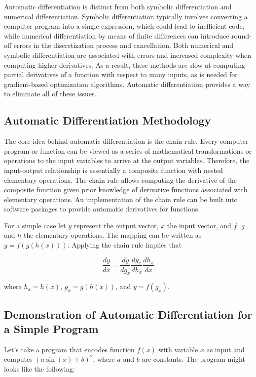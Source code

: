 \documentclass[book.tex]{subfiles}
\begin{document}
Automatic differentiation is distinct from both symbolic differentiation and numerical differentiation. Symbolic differentiation typically involves converting a computer program into a single expression, which could lead to inefficient code, while numerical differentiation by means of finite differences can introduce round-off errors in the discretization process and cancellation. Both numerical and symbolic differentiation are associated with errors and increased complexity when computing higher derivatives. As a result, these methods are slow at computing partial derivatives of a function with respect to many inputs, as is needed for gradient-based optimization algorithms. Automatic differentiation provides a way to eliminate all of these issues.

\subsection{Automatic Differentiation Methodology}
The core idea behind automatic differentiation is the chain rule. Every computer program or function can be viewed as a series of mathematical transformations or operations to the input variables to arrive at the output variables. Therefore, the input-output relationship is essentially a composite function with nested elementary operations. The chain rule allows computing the derivative of the composite function given prior knowledge of derivative functions associated with elementary operations. An implementation of the chain rule can be built into software packages to provide automatic derivatives for functions. 

For a simple case let $y$ represent the output vector, $x$  the input vector, and $f$, $g$ and $h$  the elementary operations. The mapping can be written as $y=f(g(h(x)))$. Applying the chain rule implies that

\begin{equation}
    \frac{dy}{dx}=\frac{dy}{dg_x}\frac{dg_x}{dh_x}\frac{dh_x}{dx}
\end{equation}

where $h_x=h(x)$, $g_x=g(h(x))$, and $y=f(g_x)$.

\subsection{Demonstration of Automatic Differentiation for a Simple Program}

Let's take a program that encodes function $f(x)$ with variable $x$ as input and computes $(a \sin(x)+b)^2$, where $a$ and $b$ are constants.
The program might looks like the following:
\end{document}
